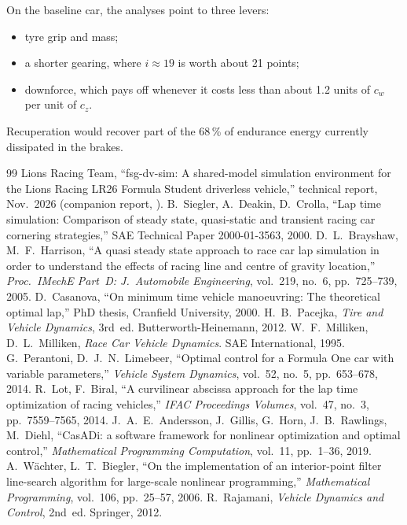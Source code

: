 \documentclass[11pt]{article}
\begin{document}
On the baseline car, the analyses point to three levers:
\begin{itemize}
  \item tyre grip and mass;
  \item a shorter gearing, where $i\approx19$ is worth about 21 points;
  \item downforce, which pays off whenever it costs less than about 1.2 units of $c_w$ per unit of $c_z$.
\end{itemize}
Recuperation would recover part of the 68\,\% of endurance energy currently dissipated in the brakes.

\begin{thebibliography}{99}\small
{} Lions Racing Team, ``fsg-dv-sim: A shared-model simulation environment for the Lions Racing LR26
Formula Student driverless vehicle,'' technical report, Nov.~2026 (companion report, ).
 B.~Siegler, A.~Deakin, D.~Crolla, ``Lap time simulation: Comparison of steady state,
quasi-static and transient racing car cornering strategies,'' SAE Technical Paper 2000-01-3563, 2000.
 D.~L.~Brayshaw, M.~F.~Harrison, ``A quasi steady state approach to race car lap simulation
in order to understand the effects of racing line and centre of gravity location,'' \emph{Proc.\ IMechE Part~D:
J.\ Automobile Engineering}, vol.~219, no.~6, pp.~725--739, 2005.
 D.~Casanova, ``On minimum time vehicle manoeuvring: The theoretical optimal lap,''
PhD thesis, Cranfield University, 2000.
 H.~B.~Pacejka, \emph{Tire and Vehicle Dynamics}, 3rd~ed. Butterworth-Heinemann, 2012.
 W.~F.~Milliken, D.~L.~Milliken, \emph{Race Car Vehicle Dynamics}. SAE International, 1995.
 G.~Perantoni, D.~J.~N.~Limebeer, ``Optimal control for a Formula One car with variable
parameters,'' \emph{Vehicle System Dynamics}, vol.~52, no.~5, pp.~653--678, 2014.
 R.~Lot, F.~Biral, ``A curvilinear abscissa approach for the lap time optimization of racing
vehicles,'' \emph{IFAC Proceedings Volumes}, vol.~47, no.~3, pp.~7559--7565, 2014.
 J.~A.~E.~Andersson, J.~Gillis, G.~Horn, J.~B.~Rawlings, M.~Diehl, ``CasADi: a software
framework for nonlinear optimization and optimal control,'' \emph{Mathematical Programming Computation}, vol.~11,
pp.~1--36, 2019.
 A.~W\"achter, L.~T.~Biegler, ``On the implementation of an interior-point filter line-search
algorithm for large-scale nonlinear programming,'' \emph{Mathematical Programming}, vol.~106, pp.~25--57, 2006.
 R.~Rajamani, \emph{Vehicle Dynamics and Control}, 2nd~ed. Springer, 2012.
\end{thebibliography}
\end{document}
